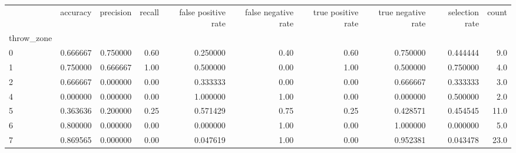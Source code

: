 \begin{tabular}{lrrrrrrrrr}
\toprule
{} &  accuracy &  precision &  recall &  false positive rate &  false negative rate &  true positive rate &  true negative rate &  selection rate &  count \\
throw\_zone &           &            &         &                      &                      &                     &                     &                 &        \\
\midrule
0          &  0.666667 &   0.750000 &    0.60 &             0.250000 &                 0.40 &                0.60 &            0.750000 &        0.444444 &    9.0 \\
1          &  0.750000 &   0.666667 &    1.00 &             0.500000 &                 0.00 &                1.00 &            0.500000 &        0.750000 &    4.0 \\
2          &  0.666667 &   0.000000 &    0.00 &             0.333333 &                 0.00 &                0.00 &            0.666667 &        0.333333 &    3.0 \\
4          &  0.000000 &   0.000000 &    0.00 &             1.000000 &                 1.00 &                0.00 &            0.000000 &        0.500000 &    2.0 \\
5          &  0.363636 &   0.200000 &    0.25 &             0.571429 &                 0.75 &                0.25 &            0.428571 &        0.454545 &   11.0 \\
6          &  0.800000 &   0.000000 &    0.00 &             0.000000 &                 1.00 &                0.00 &            1.000000 &        0.000000 &    5.0 \\
7          &  0.869565 &   0.000000 &    0.00 &             0.047619 &                 1.00 &                0.00 &            0.952381 &        0.043478 &   23.0 \\
\bottomrule
\end{tabular}

